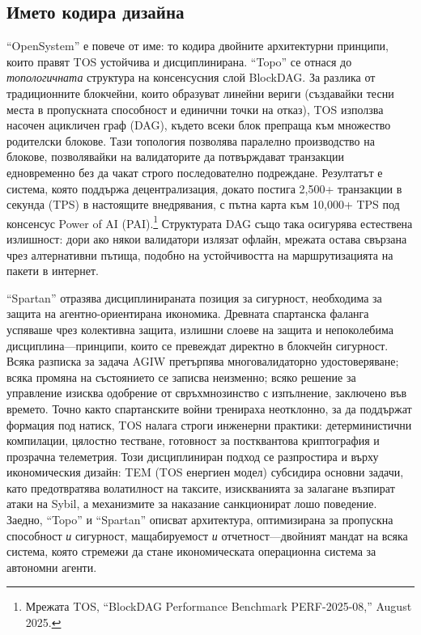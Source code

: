 \documentclass[11pt]{article}
\begin{document}
\subsection{Името кодира дизайна}
``OpenSystem'' е повече от име: то кодира двойните архитектурни принципи, които правят TOS устойчива и дисциплинирана. ``Topo'' се отнася до \emph{топологичната} структура на консенсусния слой BlockDAG. За разлика от традиционните блокчейни, които образуват линейни вериги (създавайки тесни места в пропускната способност и единични точки на отказ), TOS използва насочен ацикличен граф (DAG), където всеки блок препраща към множество родителски блокове. Тази топология позволява паралелно производство на блокове, позволявайки на валидаторите да потвърждават транзакции едновременно без да чакат строго последователно подреждане. Резултатът е система, която поддържа децентрализация, докато постига 2,500+ транзакции в секунда (TPS) в настоящите внедрявания, с пътна карта към 10,000+ TPS под консенсус Power of AI (PAI).\footnote{Мрежата TOS, ``BlockDAG Performance Benchmark PERF-2025-08,'' August 2025.} Структурата DAG също така осигурява естествена излишност: дори ако някои валидатори излязат офлайн, мрежата остава свързана чрез алтернативни пътища, подобно на устойчивостта на маршрутизацията на пакети в интернет.

``Spartan'' отразява дисциплинираната позиция за сигурност, необходима за защита на агентно-ориентирана икономика. Древната спартанска фаланга успяваше чрез колективна защита, излишни слоеве на защита и непоколебима дисциплина---принципи, които се превеждат директно в блокчейн сигурност. Всяка разписка за задача AGIW претърпява многовалидаторно удостоверяване; всяка промяна на състоянието се записва неизменно; всяко решение за управление изисква одобрение от свръхмнозинство с изпълнение, заключено във времето. Точно както спартанските войни тренираха неотклонно, за да поддържат формация под натиск, TOS налага строги инженерни практики: детерминистични компилации, цялостно тестване, готовност за постквантова криптография и прозрачна телеметрия. Този дисциплиниран подход се разпростира и върху икономическия дизайн: TEM (TOS енергиен модел) субсидира основни задачи, като предотвратява волатилност на таксите, изискванията за залагане възпират атаки на Sybil, а механизмите за наказание санкционират лошо поведение. Заедно, ``Topo'' и ``Spartan'' описват архитектура, оптимизирана за пропускна способност \emph{и} сигурност, мащабируемост \emph{и} отчетност---двойният мандат на всяка система, която стремежи да стане икономическата операционна система за автономни агенти.
\end{document}
